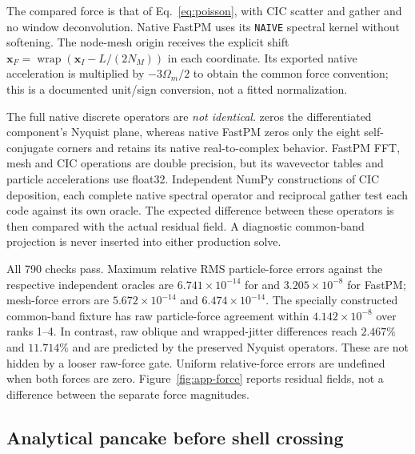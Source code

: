 The compared force is that of Eq.~\eqref{eq:poisson}, with CIC scatter and
gather and no window deconvolution.  Native FastPM uses its \texttt{NAIVE}
spectral kernel without softening.  The node-mesh origin receives the explicit
shift $\boldsymbol x_F=\operatorname{wrap}(\boldsymbol x_I-L/(2N_M))$ in each
coordinate.  Its exported native acceleration is multiplied by
$-3\Omega_m/2$ to obtain the common force convention; this is a documented
unit/sign conversion, not a fitted normalization.

The full native discrete operators are \emph{not identical}.  \IPPL zeros the
differentiated component's Nyquist plane, whereas native FastPM zeros only the
eight self-conjugate corners and retains its native real-to-complex behavior.
FastPM FFT, mesh and CIC operations are double precision, but its wavevector
tables and particle accelerations use float32.  Independent NumPy constructions
of CIC deposition, each complete native spectral operator and reciprocal gather
test each code against its own oracle.  The expected difference between these
operators is then compared with the actual residual field.  A diagnostic
common-band projection is never inserted into either production solve.

All 790 checks pass.  Maximum relative RMS particle-force errors against the
respective independent oracles are $6.741\times10^{-14}$ for \IPPL and
$3.205\times10^{-8}$ for FastPM; mesh-force errors are
$5.672\times10^{-14}$ and $6.474\times10^{-14}$.
The specially constructed common-band fixture has raw particle-force agreement
within $4.142\times10^{-8}$ over ranks 1--4.  In contrast, raw oblique and
wrapped-jitter differences reach $2.467\%$ and $11.714\%$ and are predicted by
the preserved Nyquist operators.  These are not hidden by a looser raw-force
gate.  Uniform relative-force errors are undefined when both forces are zero.
Figure~\ref{fig:app-force} reports residual fields, not a difference between
the separate force magnitudes.


\subsection{Analytical pancake before shell crossing}
\label{app:pancake}


